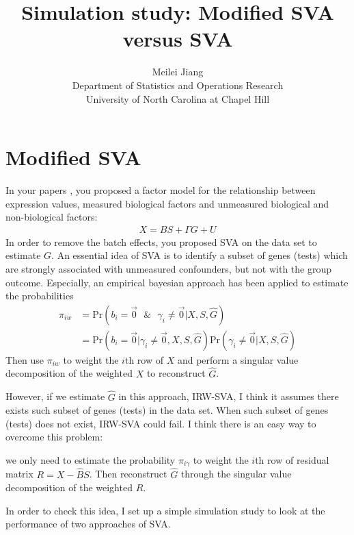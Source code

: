 \documentclass[11pt]{article}
\begin{document}
\author{Meilei Jiang\\
    Department of Statistics and Operations Research\\
		University of North Carolina at Chapel Hill}
\title{Simulation study: Modified SVA versus SVA}

\maketitle
\section{Modified SVA}
In your papers \cite{leek2007capturing, leek2008general, leek2012sva}, you proposed a factor model for the relationship between expression values, measured biological factors and unmeasured biological and non-biological factors:
$$ \begin{aligned}
X = B S + \Gamma G + U
\end{aligned}$$
In order to remove the batch effects, you proposed SVA on the data set to estimate $G$. An essential idea of SVA is to identify a subset of genes (tests) which are strongly associated with unmeasured confounders, but not with the group outcome. Especially, an empirical bayesian approach has been applied to estimate the probabilities 
$$\begin{aligned}\pi_{i w} &= \text{Pr}(b_i = \vec{0} \text{ } \& \text{ } \gamma_i \neq \vec{0} | X, S, \hat{G}) \\
&= \text{Pr}(b_i = \vec{0} | \gamma_i \neq \vec{0}, X, S, \hat{G}) \text{Pr}( \gamma_i \neq \vec{0}| X, S, \hat{G})                      
\end{aligned}$$
Then use $\pi_{i w}$ to weight the $i$th row of $X$ and perform a singular value decomposition of the weighted $X$ to reconstruct $\hat{G}$.


However, if we estimate $\hat{G}$ in this approach, IRW-SVA, I think it assumes there exists such subset of genes (tests) in the data set. When such subset of genes (tests) does not exist, IRW-SVA could fail. I think there is an easy way to overcome this problem: 

we only need to estimate the probability $\pi_{i \gamma}$ to weight the $i$th row of residual matrix $R = X - \hat{B} S$. Then reconstruct $\hat{G}$ through the singular value decomposition of the weighted $R$.

In order to check this idea, I set up a simple simulation study to look at the performance of two approaches of SVA.
\end{document}
